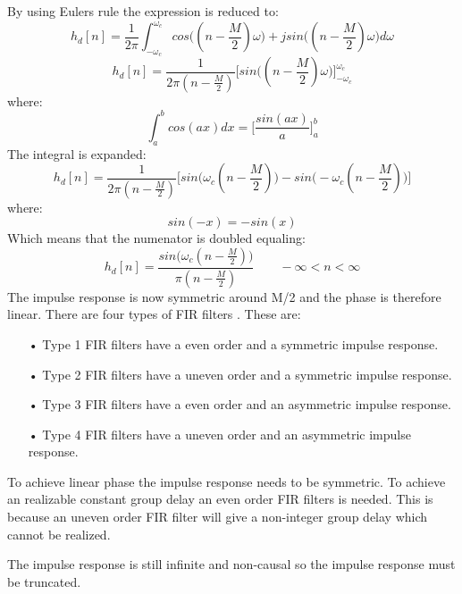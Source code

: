 By using Eulers rule the expression is reduced to:
\begin{equation}
h_d[n]=\frac{1}{2\pi}\int_{-\omega_c}^{\omega_c}cos\Big((n-\frac{M}{2})\omega\Big)+jsin\Big((n-\frac{M}{2})\omega\Big) d\omega
\end{equation}
\begin{equation}
h_d[n]=\frac{1}{2\pi(n-\frac{M}{2})}\bigg[sin\Big((n-\frac{M}{2})\omega\Big)\bigg]_{-\omega_{c}}^{\omega_{c}}
\end{equation}
where:
\begin{equation}
\int_{a}^{b}cos(ax) dx = \Big[\frac{sin(ax)}{a}\Big]_{a}^{b}
\end{equation}
The integral is expanded:
\begin{equation}
h_d[n]=\frac{1}{2\pi(n-\frac{M}{2})}\bigg[sin\Big(\omega_c(n-\frac{M}{2})\Big)-sin\Big(-\omega_c(n-\frac{M}{2})\Big)\bigg]
\end{equation}
where:
\begin{equation}
sin(-x) = -sin(x)
\end{equation}
Which means that the numenator is doubled equaling:
\begin{equation}
h_d[n]=\frac{sin\Big(\omega_c(n-\frac{M}{2})\Big)}{\pi(n-\frac{M}{2})}\qquad-\infty<n<\infty
\end{equation}
The impulse response is now symmetric around M/2 and the phase is therefore linear. There are four types of FIR filters \citep{sou:FIRpart4}. These are:
\begin{enumerate}
\item[•] Type 1 FIR filters have a even order and a symmetric impulse response.
\item[•] Type 2 FIR filters have a uneven order and a symmetric impulse response.
\item[•] Type 3 FIR filters have a even order and an asymmetric impulse response.
\item[•] Type 4 FIR filters have a uneven order and an asymmetric impulse response.
\end{enumerate}

To achieve linear phase the impulse response needs to be symmetric. To achieve an realizable constant group delay an even order FIR filters is needed. This is because an uneven order FIR filter will give a non-integer group delay which cannot be realized.


The impulse response is still infinite and non-causal so the impulse response must be truncated.



